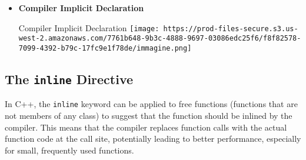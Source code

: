 \begin{itemize}
    \textbf{Rule of Three}
    
    If a class defines (or deletes) one of the three special member functions:
    
    \begin{itemize}
        \item Destructor
        \item Copy constructor
        \item Copy assignment operator
    \end{itemize}
    
    then it should probably provide all three of them.
    
    \begin{neonlisting}[language=C++]{Destructor Example}
class FileHandler {
public:
    FileHandler(std::string filename) : filename(filename) {
        file.open(filename);
    }

    ~FileHandler() {
        if (file.is_open()) {
            file.close();
        }
    }

    std::string filename;
    std::ofstream file;
};

... {
    // Automatically destroyed when going out of scope.
    FileHandler file{"data.txt"};
}
// When going out of scope, destructor is called, and the file is closed.
\end{neonlisting}
    
    \item \textbf{Compiler Implicit Declaration}
    
    \begin{neonlisting}[language=C++]{Compiler Implicit Declaration}
\texttt{[image: https://prod-files-secure.s3.us-west-2.amazonaws.com/7761b648-9b3c-4888-9697-03086edc25f6/f8f82578-7099-4392-b79c-17fc9e1f78de/immagine.png]}
\end{neonlisting}
\end{itemize}

\subsection{The \texttt{inline} Directive}

In C++, the \texttt{inline} keyword can be applied to free functions (functions that are not members of any class) to suggest that the function should be inlined by the compiler. This means that the compiler replaces function calls with the actual function code at the call site, potentially leading to better performance, especially for small, frequently used functions.

